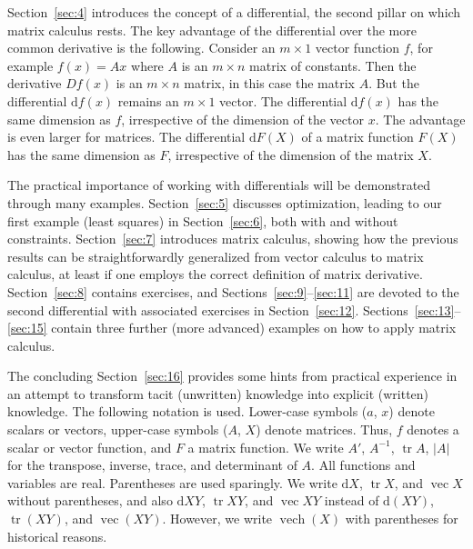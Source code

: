 \documentclass[12pt,a4paper]{article}
\theoremstyle{definition}
\DeclareMathOperator{\tr}{tr}
\DeclareMathOperator{\vech}{vech}
\DeclareMathOperator{\avec}{vec}
\newcommand{\dd}{\mathrm{d}}
\begin{document}
Section~\ref{sec:4} introduces the concept of a differential, the second pillar on which matrix calculus rests. %
The key advantage of the differential over the more common derivative is the following. Consider an $m \times 1$ vector function $f$, for example $f(x) = Ax$ where $A$ is an $m \times n$ matrix of constants. Then the derivative $Df(x)$ is an $m \times n$ matrix, in this case the matrix $A$. But the differential $\dd f(x)$ remains an $m \times 1$ vector. %
The differential $\dd f(x)$ has the same dimension as $f$, irrespective of the dimension of the vector $x$. The advantage is even larger for matrices. The differential $\dd F(X)$ of a matrix function $F(X)$ has the same dimension as $F$, irrespective of the dimension of the matrix $X$. %

The practical importance of working with differentials will be demonstrated through many examples. Section~\ref{sec:5} discusses optimization, leading to our first example (least squares) in Section~\ref{sec:6}, both with and without constraints. %
Section~\ref{sec:7} introduces matrix calculus, showing how the previous results can be straightforwardly generalized from vector calculus to matrix calculus, at least if one employs the correct definition of matrix derivative. %
Section~\ref{sec:8} contains exercises, and Sections~\ref{sec:9}--\ref{sec:11} are devoted to the second differential with associated exercises in Section~\ref{sec:12}. Sections~\ref{sec:13}--\ref{sec:15} contain three further (more advanced) examples on how to apply matrix calculus. %

The concluding Section~\ref{sec:16} provides some hints from practical experience in an attempt to transform tacit (unwritten) knowledge into explicit (written) knowledge. %
The following notation is used. Lower-case symbols ($a$, $x$) denote scalars or vectors, upper-case symbols ($A$, $X$) denote matrices. Thus, $f$ denotes a scalar or vector function, and $F$ a matrix function. We write $A'$, $A^{-1}$, $\tr A$, $|A|$ for the transpose, inverse, trace, and determinant of $A$. All functions and variables are real. Parentheses are used sparingly. %
We write $\dd X$, $\tr X$, and $\avec X$ without parentheses, and also $\dd XY$, $\tr XY$, and $\avec XY$ instead of $\dd(XY)$, $\tr(XY)$, and $\avec(XY)$. However, we write $\vech(X)$ with parentheses for historical reasons. %

\end{document}
